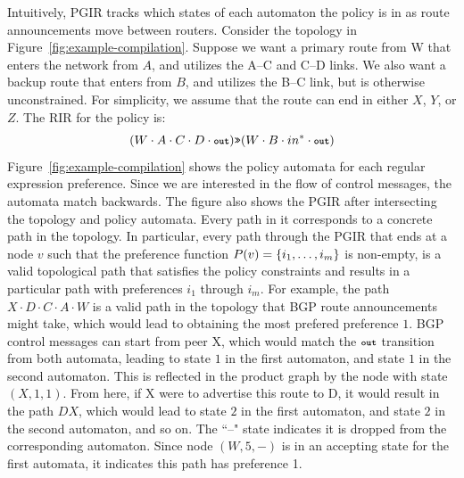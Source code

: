 Intuitively, PGIR tracks which states of each automaton the policy is in as route announcements move between routers.
%
Consider the topology in Figure~\ref{fig:example-compilation}. Suppose we want a primary route from W that enters the network from $A$, and utilizes the A--C and C--D links. We also want a backup route that enters from $B$, and utilizes the B--C link, but is otherwise unconstrained. For simplicity, we assume that the route can end in either $X$, $Y$, or $Z$. The RIR for the policy is:
%
$$(W \cdot A \cdot C \cdot D \cdot \Out) \Prefer (W \cdot B \cdot in^* \cdot \Out)$$
%
Figure~\ref{fig:example-compilation} shows the policy automata for each regular expression preference. Since we are interested in the flow of control messages, the automata match backwards.
%
The figure also shows the PGIR after intersecting the topology and policy automata. Every path in it corresponds to a concrete path in the topology. In particular, every path through the PGIR that ends at a node $v$ such that the preference function $P(v) = \{ i_1, \dots, i_m \} $ is non-empty, is a valid topological path that satisfies the policy constraints and results in a particular path with preferences $i_1$ through $i_m$.
%
For example, the path $X \cdot D \cdot C \cdot A \cdot W$ is a valid path in the topology that BGP route announcements might take, which would lead to obtaining the most prefered preference $1$.
BGP control messages can start from peer X, which would match the $\Out$ transition from both automata, leading to state $1$ in the first automaton, and state $1$ in the second automaton. This is reflected in the product graph by the node with state $(X,1,1)$. From here, if X were to advertise this route to D, it would result in the path $D X$, which would lead to state $2$ in the first automaton, and state $2$ in the second automaton, and so on.
%
The ``--" state indicates it is dropped from the corresponding automaton. Since node $(W,5,-)$ is in an accepting state for the first automata, it indicates this path has preference 1.


